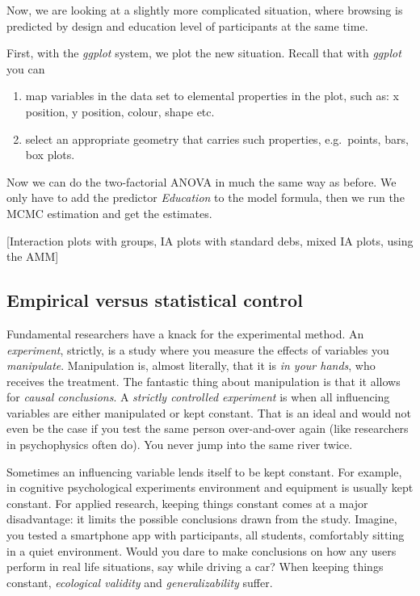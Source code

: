 \documentclass[]{svmono}
\begin{document}
Now, we are looking at a slightly more complicated situation, where
browsing is predicted by design and education level of participants at
the same time.

First, with the \emph{ggplot} system, we plot the new situation. Recall
that with \emph{ggplot} you can

\begin{enumerate}
\def\labelenumi{\arabic{enumi}.}
\item
  map variables in the data set to elemental properties in the plot,
  such as: x position, y position, colour, shape etc.
\item
  select an appropriate geometry that carries such properties,
  e.g.~points, bars, box plots.
\end{enumerate}

Now we can do the two-factorial ANOVA in much the same way as before. We
only have to add the predictor \emph{Education} to the model formula,
then we run the MCMC estimation and get the estimates.

{[}Interaction plots with groups, IA plots with standard debs, mixed IA
plots, using the AMM{]}

\subsection{Empirical versus statistical
control}\label{empirical-versus-statistical-control}

Fundamental researchers have a knack for the experimental method. An
\emph{experiment}, strictly, is a study where you measure the effects of
variables you \emph{manipulate}. Manipulation is, almost literally, that
it is \emph{in your hands}, who receives the treatment. The fantastic
thing about manipulation is that it allows for \emph{causal
conclusions}. A \emph{strictly controlled experiment} is when all
influencing variables are either manipulated or kept constant. That is
an ideal and would not even be the case if you test the same person
over-and-over again (like researchers in psychophysics often do). You
never jump into the same river twice.

Sometimes an influencing variable lends itself to be kept constant. For
example, in cognitive psychological experiments environment and
equipment is usually kept constant. For applied research, keeping things
constant comes at a major disadvantage: it limits the possible
conclusions drawn from the study. Imagine, you tested a smartphone app
with participants, all students, comfortably sitting in a quiet
environment. Would you dare to make conclusions on how any users perform
in real life situations, say while driving a car? When keeping things
constant, \emph{ecological validity} and \emph{generalizability} suffer.
\end{document}
